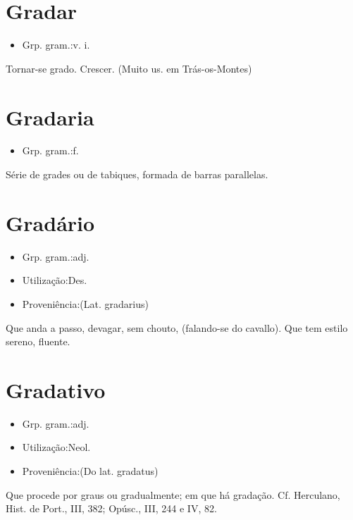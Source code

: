 \section{Gradar}
\begin{itemize}
\item {Grp. gram.:v. i.}
\end{itemize}
Tornar-se grado.
Crescer. (Muito us. em Trás-os-Montes)
\section{Gradaria}
\begin{itemize}
\item {Grp. gram.:f.}
\end{itemize}
Série de grades ou de tabiques, formada de barras parallelas.
\section{Gradário}
\begin{itemize}
\item {Grp. gram.:adj.}
\end{itemize}
\begin{itemize}
\item {Utilização:Des.}
\end{itemize}
\begin{itemize}
\item {Proveniência:(Lat. \textunderscore gradarius\textunderscore )}
\end{itemize}
Que anda a passo, devagar, sem chouto, (falando-se do cavallo).
Que tem estilo sereno, fluente.
\section{Gradativo}
\begin{itemize}
\item {Grp. gram.:adj.}
\end{itemize}
\begin{itemize}
\item {Utilização:Neol.}
\end{itemize}
\begin{itemize}
\item {Proveniência:(Do lat. \textunderscore gradatus\textunderscore )}
\end{itemize}
Que procede por graus ou gradualmente; em que há gradação. Cf. Herculano, \textunderscore Hist. de Port.\textunderscore , III, 382; \textunderscore Opúsc.\textunderscore , III, 244 e IV, 82.
